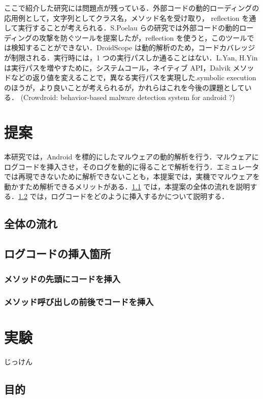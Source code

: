 \documentclass[12pt]{jsarticle}
\begin{document}
ここで紹介した研究には問題点が残っている．外部コードの動的ローディングの応用例として，文字列としてクラス名，メソッド名を受け取り，  reflection を通して実行することが考えられる．S.Poelau らの研究では外部コードの動的ローディングの攻撃を防ぐツールを提案したが，reflection を使うと，このツールでは検知することができない．DroidScope は動的解析のため，コードカバレッジが制限される．実行時には，1 つの実行パスしか通ることはない．L.Yan, H.Yin は実行パスを増やすために，システムコール，ネイティブ API，Dalvik メソッドなどの返り値を変えることで，異なる実行パスを実現した.symbolic execution のほうが，より良いことが考えられるが，かれらはこれを今後の課題としている．
(Crowdroid: behavior-based malware detection system for android ?)

\newpage
\section{提案}
本研究では，Android を標的にしたマルウェアの動的解析を行う．マルウェアにログコードを挿入させ，そのログを動的に得ることで解析を行う．エミュレータでは再現できないために解析できないことも，本提案では，実機でマルウェアを動かすため解析できるメリットがある．\ref{overview} では，本提案の全体の流れを説明する．\ref{placeinsert} では，ログコードをどのように挿入するかについて説明する．
\subsection{全体の流れ}
\label{overview}

\subsection{ログコードの挿入箇所}
\label{placeinsert}
\subsubsection{メソッドの先頭にコードを挿入}
 
\subsubsection{メソッド呼び出しの前後でコードを挿入}

\newpage
\section{実験}
\label{sec:exp}
じっけん
\subsection{目的}
\end{document}
